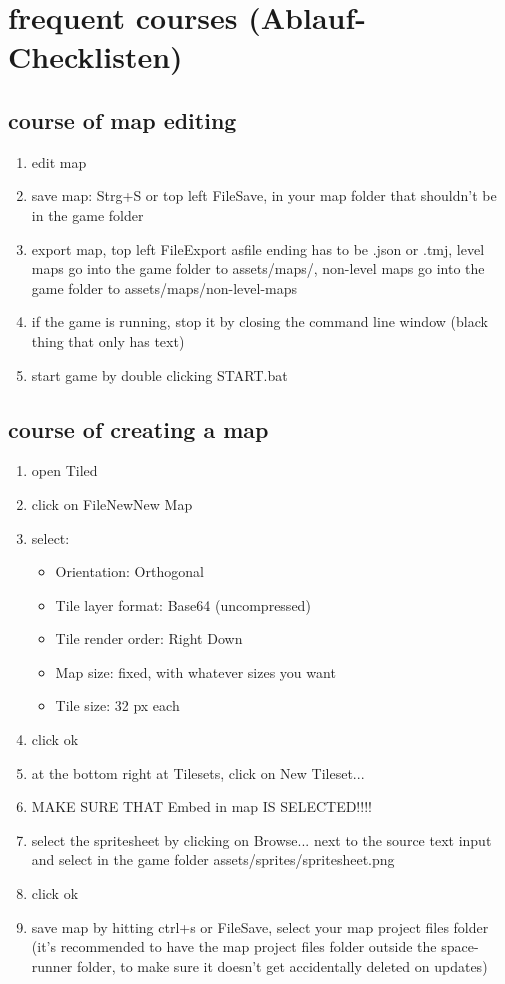 \documentclass{article}
\begin{document}
\tableofcontents

\newpage

\section{frequent courses (Ablauf-Checklisten)}
\subsection{course of map editing}
\begin{enumerate}
	\item edit map
	\item save map: Strg+S or top left File\textrangle Save, in your map folder that shouldn't be in the game folder
	\item export map, top left File\textrangle Export as\textrangle file ending has to be .json or .tmj, level maps go into the game folder to assets/maps/, non-level maps go into the game folder to assets/maps/non-level-maps
	\item if the game is running, stop it by closing the command line window (black thing that only has text)
	\item start game by double clicking START.bat
\end{enumerate}

\subsection{course of creating a map}
\begin{enumerate}
	\item open Tiled
	\item click on File\textrangle New\textrangle New Map
	\item select:
	\begin{itemize}
		\item Orientation: Orthogonal
		\item Tile layer format: Base64 (uncompressed)
		\item Tile render order: Right Down
		\item Map size: fixed, with whatever sizes you want
		\item Tile size: 32 px each
	\end{itemize}
	\item click ok
	\item at the bottom right at Tilesets, click on New Tileset...
	\item MAKE SURE THAT Embed in map IS SELECTED!!!!
	\item select the spritesheet by clicking on Browse... next to the source text input and select in the game folder assets/sprites/spritesheet.png
	\item click ok
	\item save map by hitting ctrl+s or File\textrangle Save, select your map project files folder (it's recommended to have the map project files folder outside the space-runner folder, to make sure it doesn't get accidentally deleted on updates)
\end{enumerate}
\end{document}
